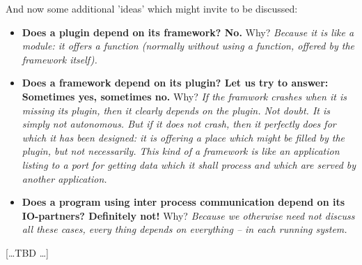 And now some additional 'ideas' which might invite to be discussed:

\begin{itemize}
  \item \textbf{Does a plugin depend on its framework? No.} Why? \emph{
  Because it is like a module: it offers a function (normally without using
  a function, offered by the framework itself).}
  \item \textbf{Does a framework depend on its plugin? Let us try to answer:
  Sometimes yes, sometimes no.} Why? \emph{If the framwork crashes when it is
  missing its plugin, then it clearly depends on the plugin. Not doubt. It is
  simply not autonomous. But if it does not crash, then it perfectly does for
  which it has been designed: it is offering a place which might be filled by
  the plugin, but not necessarily. This kind of a framework is like an
  application listing to a port for getting data which it shall process and
  which are served by another application.}
  \item \textbf{Does a program using inter process communication depend on its
  IO-partners? Definitely not!} Why? \emph{Because we otherwise need not discuss
  all these cases, every thing depends on everything -- in each running system.}
\end{itemize}

[\ldots TBD \ldots]

%
